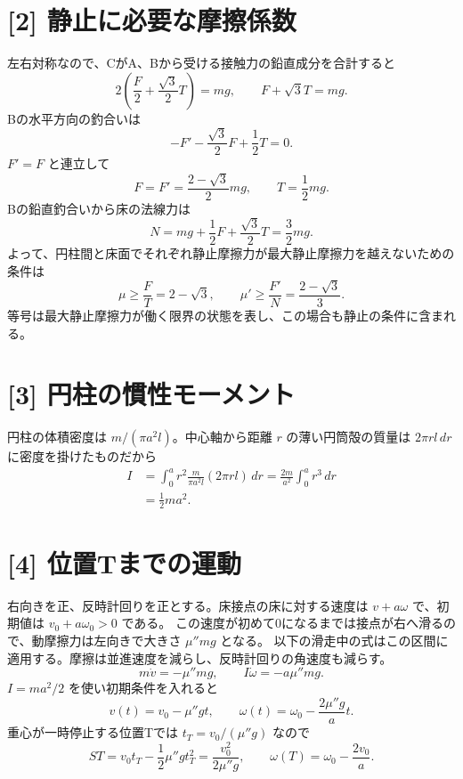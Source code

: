 \documentclass[11pt,a4paper]{article}
\begin{document}
\section*{[2] 静止に必要な摩擦係数}
左右対称なので、CがA、Bから受ける接触力の鉛直成分を合計すると
\begin{equation}
  2\left(\frac{F}{2}+\frac{\sqrt3}{2}T\right)=mg,
  \qquad F+\sqrt3T=mg.
\end{equation}
Bの水平方向の釣合いは
\begin{equation}
  -F'-\frac{\sqrt3}{2}F+\frac12T=0.
\end{equation}
$F'=F$ と連立して
\begin{equation}
  F=F'=\frac{2-\sqrt3}{2}mg,\qquad T=\frac12mg.
\end{equation}
Bの鉛直釣合いから床の法線力は
\begin{equation}
  N=mg+\frac12F+\frac{\sqrt3}{2}T=\frac32mg.
\end{equation}
よって、円柱間と床面でそれぞれ静止摩擦力が最大静止摩擦力を越えないための条件は
\begin{equation}
  \boxed{\mu\geq\frac FT=2-\sqrt3,\qquad
         \mu'\geq\frac{F'}{N}=\frac{2-\sqrt3}{3}.}
\end{equation}
等号は最大静止摩擦力が働く限界の状態を表し、この場合も静止の条件に含まれる。

\section*{[3] 円柱の慣性モーメント}
円柱の体積密度は $m/(\pi a^2l)$。中心軸から距離 $r$ の薄い円筒殻の質量は $2\pi rl\,dr$ に密度を掛けたものだから
\begin{align}
  I&=\int_0^a r^2\frac{m}{\pi a^2l}(2\pi rl)\,dr
   =\frac{2m}{a^2}\int_0^a r^3\,dr\\
   &=\boxed{\frac12ma^2}.
\end{align}

\section*{[4] 位置Tまでの運動}
右向きを正、反時計回りを正とする。床接点の床に対する速度は $v+a\omega$ で、初期値は $v_0+a\omega_0>0$ である。
この速度が初めて0になるまでは接点が右へ滑るので、動摩擦力は左向きで大きさ $\mu''mg$ となる。
以下の滑走中の式はこの区間に適用する。摩擦は並進速度を減らし、反時計回りの角速度も減らす。
\begin{equation}
  m\dot v=-\mu''mg,\qquad I\dot\omega=-a\mu''mg.
\end{equation}
$I=ma^2/2$ を使い初期条件を入れると
\begin{equation}
  v(t)=v_0-\mu''gt,\qquad
  \omega(t)=\omega_0-\frac{2\mu''g}{a}t.
\end{equation}
重心が一時停止する位置Tでは $t_T=v_0/(\mu''g)$ なので
\begin{equation}
  \boxed{ST=v_0t_T-\frac12\mu''gt_T^2=\frac{v_0^2}{2\mu''g}},
  \qquad
  \boxed{\omega(T)=\omega_0-\frac{2v_0}{a}}.
\end{equation}
\end{document}
